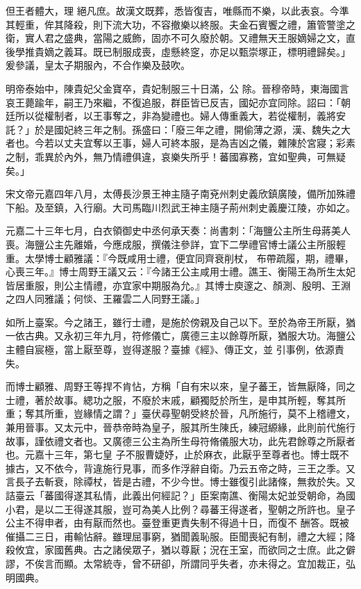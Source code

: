 \begin{pinyinscope}
 但王者體大，理
 絕凡庶。故漢文既葬，悉皆復吉，唯縣而不樂，以此表哀。今準其輕重，侔其降殺，則下流大功，不容撤樂以終服。夫金石賓饗之禮，簫管警塗之衛，實人君之盛典，當陽之威飾，固亦不可久廢於朝。又禮無天王服嫡婦之文，直後學推貴嫡之義耳。既已制服成喪，虛懸終窆，亦足以甄崇塚正，標明禮歸矣。」爰參議，皇太子期服內，不合作樂及鼓吹。



 明帝泰始中，陳貴妃父金寶卒，貴妃制服三十日滿，公
 除。晉穆帝時，東海國言哀王薨踰年，嗣王乃來繼，不復追服，群臣皆已反吉，國妃亦宜同除。詔曰：「朝廷所以從權制者，以王事奪之，非為變禮也。婦人傳重義大，若從權制，義將安託？」於是國妃終三年之制。孫盛曰：「廢三年之禮，開偷薄之源，漢、魏失之大者也。今若以丈夫宜奪以王事，婦人可終本服，是為吉凶之儀，雜陳於宮寢；彩素之制，乖異於內外，無乃情禮俱違，哀樂失所乎！蕃國寡務，宜如聖典，可無疑矣。」



 宋文帝元嘉四年八月，太傅長沙景王神主隨子南兗州刺史義欣鎮廣陵，備所加殊禮下船。及至鎮，入行廟。大司馬臨川烈武王神主隨子荊州刺史義慶江陵，亦如之。



 元嘉二十三年七月，白衣領御史中丞何承天奏：尚書刺：「海鹽公主所生母蔣美人喪。海鹽公主先離婚，今應成服，撰儀注參詳，宜下二學禮官博士議公主所服輕重。太學博士顧雅議：『今既咸用士禮，便宜同齊衰削杖，
 布帶疏履，期，禮畢，心喪三年。』博士周野王議又云：『今諸王公主咸用士禮。譙王、衡陽王為所生太妃皆居重服，則公主情禮，亦宜家中期服為允。』其博士庾邃之、顏測、殷明、王淵之四人同雅議；何惔、王羅雲二人同野王議。」



 如所上臺案。今之諸王，雖行士禮，是施於傍親及自己以下。至於為帝王所厭，猶一依古典。又永初三年九月，符修儀亡，廣德三主以餘尊所厭，猶服大功。海鹽公主體自宸極，當上厭至尊，豈得遂服？臺據《經》、傳正文，並
 引事例，依源責失。



 而博士顧雅、周野王等捍不肯怗，方稱「自有宋以來，皇子蕃王，皆無厭降，同之士禮，著於故事。緦功之服，不廢於末戚，顧獨貶於所生，是申其所輕，奪其所重；奪其所重，豈緣情之謂？」臺伏尋聖朝受終於晉，凡所施行，莫不上稽禮文，兼用晉事。又太元中，晉恭帝時為皇子，服其所生陳氏，練冠縓緣，此則前代施行故事，謹依禮文者也。又廣德三公主為所生母符脩儀服大功，此先君餘尊之所厭者也。元嘉十三年，第七皇
 子不服曹婕妤，止於麻衣，此厭乎至尊者也。博士既不據古，又不依今，背違施行見事，而多作浮辭自衛。乃云五帝之時，三王之季。又言長子去斬衰，除禫杖，皆是古禮，不少今世。博士雖復引此諸條，無救於失。又詰臺云「蕃國得遂其私情，此義出何經記？」臣案南譙、衡陽太妃並受朝命，為國小君，是以二王得遂其服，豈可為美人比例？尋蕃王得遂者，聖朝之所許也。皇子公主不得申者，由有厭而然也。臺登重更責失制不得過十日，而復不
 酬答。既被催攝二三日，甫輸怗辭。雖理屈事窮，猶聞義恥服。臣聞喪紀有制，禮之大經；降殺攸宜，家國舊典。古之諸侯眾子，猶以尊厭；況在王室，而欲同之士庶。此之僻謬，不俟言而顯。太常統寺，曾不研卻，所謂同乎失者，亦未得之。宜加裁正，弘明國典。




\end{pinyinscope}
